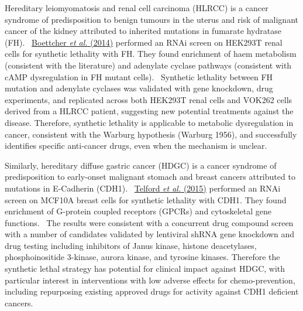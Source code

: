 Hereditary leiomyomatosis and renal cell carcinoma (HLRCC) is a cancer
syndrome of predisposition to benign tumours in the uterus and risk of
malignant cancer of the kidney attributed to inherited mutations in
fumarate hydratase (FH).
\ \hyperlink{ENREF14}{Boettcher}\hyperlink{ENREF14}{\textit{ et
al.}}\hyperlink{ENREF14}{ (2014)} performed an RNAi screen on HEK293T
renal cells for synthetic lethality with FH. They found enrichment of
haem metabolism (consistent with the literature) and adenylate cyclase
pathways (consistent with cAMP dysregulation in FH mutant cells).
\ Synthetic lethality between FH mutation and adenylate cyclases was
validated with gene knockdown, drug experiments, and replicated across
both HEK293T renal cells and VOK262 cells derived from a HLRCC patient,
suggesting new potential treatments against the disease. Therefore,
synthetic lethality is applicable to metabolic dysregulation in cancer,
consistent with the Warburg hypothesis (Warburg 1956), and successfully
identifies specific anti-cancer drugs, even when the mechanism is
unclear. \


Similarly, hereditary diffuse gastric cancer (HDGC) is a cancer syndrome
of predisposition to early-onset malignant stomach and breast cancers
attributed to mutations in E-Cadherin (CDH1).
\ \hyperlink{ENREF94}{Telford}\hyperlink{ENREF94}{\textit{ et
al.}}\hyperlink{ENREF94}{ (2015)} performed an RNAi screen on MCF10A
breast cells for synthetic lethality with CDH1. They found enrichment
of G-protein coupled receptors (GPCRs) and cytoskeletal gene functions.
\ The results were consistent with a concurrent drug compound screen
with a number of candidates validated by lentiviral shRNA gene
knockdown and drug testing including inhibitors of Janus kinase,
histone deacetylases, phosphoinositide 3-kinase, aurora kinase, and
tyrosine kinases. Therefore the synthetic lethal strategy has
potential for clinical impact against HDGC, with particular interest in
interventions with low adverse effects for chemo-prevention, including
repurposing existing approved drugs for activity against CDH1 deficient
cancers. 



